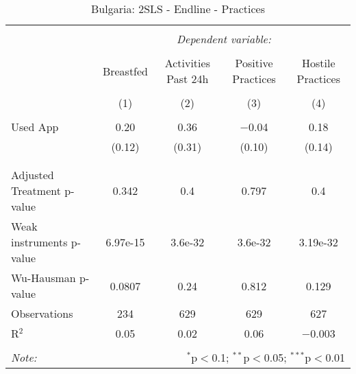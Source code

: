 
\begin{table}[!htbp] \centering 
  \caption{Bulgaria: 2SLS - Endline - Practices} 
  \label{tbl:Bulgaria: 2SLS - Endline - Practices} 
\begin{tabular}{@{\extracolsep{5pt}}lcccc} 
\\[-1.8ex]\hline 
\hline \\[-1.8ex] 
 & \multicolumn{4}{c}{\textit{Dependent variable:}} \\ 
\cline{2-5} 
\\[-1.8ex] & Breastfed & Activities Past 24h & Positive Practices & Hostile Practices \\ 
\\[-1.8ex] & (1) & (2) & (3) & (4)\\ 
\hline \\[-1.8ex] 
 Used App & 0.20 & 0.36 & $-$0.04 & 0.18 \\ 
  & (0.12) & (0.31) & (0.10) & (0.14) \\ 
  & & & & \\ 
\hline \\[-1.8ex] 
Adjusted Treatment p-value & 0.342 & 0.4 & 0.797 & 0.4 \\ 
Weak instruments p-value & 6.97e-15 & 3.6e-32 & 3.6e-32 & 3.19e-32 \\ 
Wu-Hausman p-value & 0.0807 & 0.24 & 0.812 & 0.129 \\ 
Observations & 234 & 629 & 629 & 627 \\ 
R$^{2}$ & 0.05 & 0.02 & 0.06 & $-$0.003 \\ 
\hline 
\hline \\[-1.8ex] 
\textit{Note:}  & \multicolumn{4}{r}{$^{*}$p$<$0.1; $^{**}$p$<$0.05; $^{***}$p$<$0.01} \\ 
\end{tabular} 
\end{table} 

